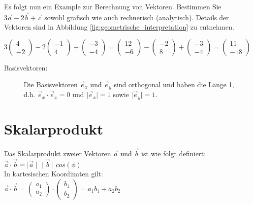 Es folgt nun ein Example zur Berechnung von Vektoren.
Bestimmen Sie
\begin{math}
	3 \vec{a} - 2 \vec{b} + \vec{c}
\end{math}
sowohl grafisch wie auch rechnerisch (analytisch). Details der Vektoren sind in Abbildung \ref{fig:geometrische_interpretation} zu entnehmen.

\begin{math}
	3 \begin{pmatrix} 4 \\ -2 \end{pmatrix} - 
	2 \begin{pmatrix} -1 \\ 4 \end{pmatrix} + 
	\begin{pmatrix} -3 \\ -4 \end{pmatrix} = 
	\begin{pmatrix} 12 \\ -6 \end{pmatrix} -
	\begin{pmatrix} -2 \\ 8 \end{pmatrix} +
	\begin{pmatrix} -3 \\ -4 \end{pmatrix} =
	\begin{pmatrix} 11 \\ -18 \end{pmatrix}
\end{math}

\begin{description}
	\item[Basisvektoren:]
	Die Basisvektoren $\vec{e}_x$ und $\vec{e}_y$ sind orthogonal und haben die Länge 1,\\
	d.h. $\vec{e}_x \cdot \vec{e}_x = 0$ und $\mid \vec{e}_x \mid = 1$ sowie $\mid \vec{e}_y \mid = 1$.
\end{description}

\section{Skalarprodukt}

Das Skalarprodukt zweier Vektoren $\vec{a}$ und $\vec{b}$ ist wie folgt definiert:\\
$\vec{a} \cdot \vec{b} = \mid \vec{a} \mid \dot \mid \vec{b} \mid cos(\phi)$\\
In kartesischen Koordinaten gilt:\\
$\vec{a} \cdot \vec{b} =
\begin{pmatrix} a_{1} \\ a_{2} \end{pmatrix} \cdot
\begin{pmatrix} b_{1} \\ b_{2} \end{pmatrix} =
a_{1} b_{1} + a_{2} b_{2}$

